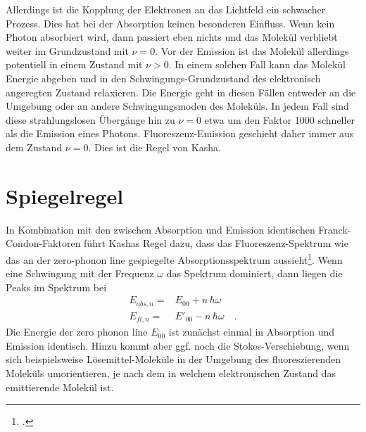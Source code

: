 Allerdings ist die Kopplung der Elektronen an das Lichtfeld ein schwacher Prozess. Dies hat bei der Absorption keinen besonderen Einfluss. Wenn kein Photon absorbiert wird, dann passiert eben nichts und das Molekül verbliebt weiter im Grundzustand mit $\nu = 0$. Vor der Emission ist das Molekül allerdings potentiell in einem Zustand mit $\nu > 0$. In einem solchen Fall kann das Molekül Energie abgeben und in den Schwingungs-Grundzustand des elektronisch angeregten Zustand relaxieren. Die Energie geht in diesen Fällen entweder an die Umgebung oder an andere Schwingungsmoden des Moleküls. In jedem Fall sind diese strahlungslosen Übergänge hin zu $\nu = 0$ etwa um den Faktor 1000 schneller als die Emission eines Photons. Fluoreszenz-Emission geschieht daher immer aus dem Zustand $\nu = 0$. Dies ist die Regel von Kasha.

\section{Spiegelregel}

In Kombination mit den zwischen Absorption und Emission identischen Franck-Condon-Faktoren führt  Kashas Regel dazu, dass das Fluoreszenz-Spektrum wie das an der zero-phonon line gespiegelte Absorptionsspektrum aussieht\footcite[Kapitel 1.3.2 und 1.3.3]{Lakowicz2010}. Wenn eine Schwingung mit der Frequenz $\omega$ das Spektrum dominiert, dann liegen die Peaks im Spektrum bei
\begin{align}
  E_{abs, n} = & E_{00} + n \, \hbar \omega \\
  E_{fl, n} = & E'_{00} - n \, \hbar \omega \quad .
\end{align}
Die Energie der zero phonon line $E_{00}$ ist zunächst einmal in Absorption und Emission identisch.  Hinzu kommt aber ggf. noch die Stokes-Verschiebung, wenn sich beispielsweise Lösemittel-Moleküle in der Umgebung des fluoreszierenden Moleküls umorientieren, je nach dem in welchem elektronischen Zustand das emittierende Molekül ist.



